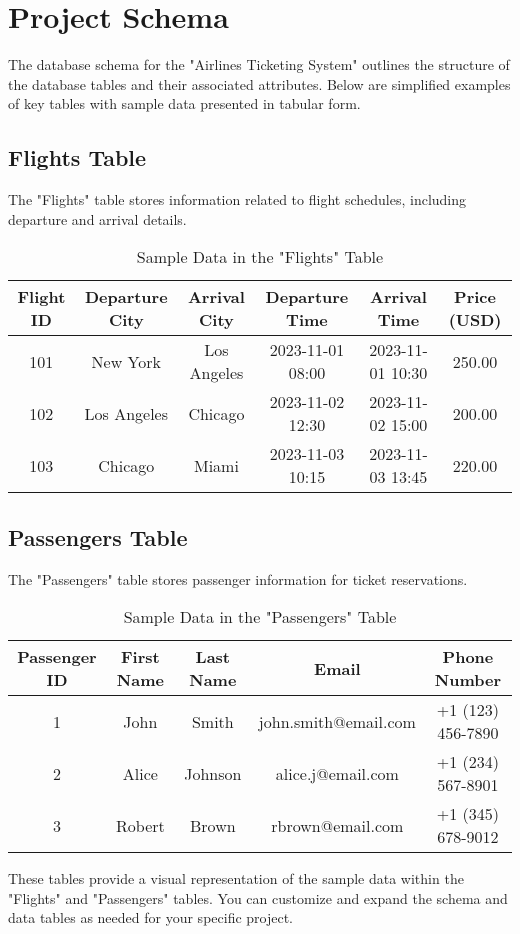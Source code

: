 \section{Project Schema}
The database schema for the "Airlines Ticketing System" outlines the structure of the database tables and their associated attributes. Below are simplified examples of key tables with sample data presented in tabular form.

\subsection{Flights Table}
The "Flights" table stores information related to flight schedules, including departure and arrival details.

\begin{table}[h]
\centering
\begin{tabular}{|c|c|c|c|c|c|}
\hline
Flight ID & Departure City & Arrival City & Departure Time & Arrival Time & Price (USD) \\
\hline
101 & New York & Los Angeles & 2023-11-01 08:00 & 2023-11-01 10:30 & 250.00 \\
102 & Los Angeles & Chicago & 2023-11-02 12:30 & 2023-11-02 15:00 & 200.00 \\
103 & Chicago & Miami & 2023-11-03 10:15 & 2023-11-03 13:45 & 220.00 \\
\hline
\end{tabular}
\caption{Sample Data in the "Flights" Table}
\end{table}

\subsection{Passengers Table}
The "Passengers" table stores passenger information for ticket reservations.

\begin{table}[h]
\centering
\begin{tabular}{|c|c|c|c|c|}
\hline
Passenger ID & First Name & Last Name & Email & Phone Number \\
\hline
1 & John & Smith & john.smith@email.com & +1 (123) 456-7890 \\
2 & Alice & Johnson & alice.j@email.com & +1 (234) 567-8901 \\
3 & Robert & Brown & rbrown@email.com & +1 (345) 678-9012 \\
\hline
\end{tabular}
\caption{Sample Data in the "Passengers" Table}
\end{table}

These tables provide a visual representation of the sample data within the "Flights" and "Passengers" tables. You can customize and expand the schema and data tables as needed for your specific project.



\clearpage